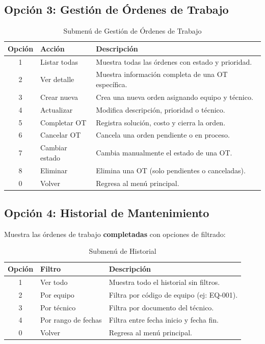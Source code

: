 \documentclass[12pt, a4paper]{article}
\begin{document}
\subsection{Opci\'on 3: Gesti\'on de \'Ordenes de Trabajo}

\begin{table}[H]
    \centering
    \begin{tabularx}{\textwidth}{c l X}
        \toprule
        \textbf{Opci\'on} & \textbf{Acci\'on} & \textbf{Descripci\'on} \\
        \midrule
        1 & Listar todas & Muestra todas las \'ordenes con estado y prioridad. \\
        2 & Ver detalle & Muestra informaci\'on completa de una OT espec\'ifica. \\
        3 & Crear nueva & Crea una nueva orden asignando equipo y t\'ecnico. \\
        4 & Actualizar & Modifica descripci\'on, prioridad o t\'ecnico. \\
        5 & Completar OT & Registra soluci\'on, costo y cierra la orden. \\
        6 & Cancelar OT & Cancela una orden pendiente o en proceso. \\
        7 & Cambiar estado & Cambia manualmente el estado de una OT. \\
        8 & Eliminar & Elimina una OT (solo pendientes o canceladas). \\
        0 & Volver & Regresa al men\'u principal. \\
        \bottomrule
    \end{tabularx}
    \caption{Submen\'u de Gesti\'on de \'Ordenes de Trabajo}
\end{table}

\subsection{Opci\'on 4: Historial de Mantenimiento}

Muestra las \'ordenes de trabajo \textbf{completadas} con opciones de filtrado:

\begin{table}[H]
    \centering
    \begin{tabularx}{\textwidth}{c l X}
        \toprule
        \textbf{Opci\'on} & \textbf{Filtro} & \textbf{Descripci\'on} \\
        \midrule
        1 & Ver todo & Muestra todo el historial sin filtros. \\
        2 & Por equipo & Filtra por c\'odigo de equipo (ej: EQ-001). \\
        3 & Por t\'ecnico & Filtra por documento del t\'ecnico. \\
        4 & Por rango de fechas & Filtra entre fecha inicio y fecha fin. \\
        0 & Volver & Regresa al men\'u principal. \\
        \bottomrule
    \end{tabularx}
    \caption{Submen\'u de Historial}
\end{table}
\end{document}
